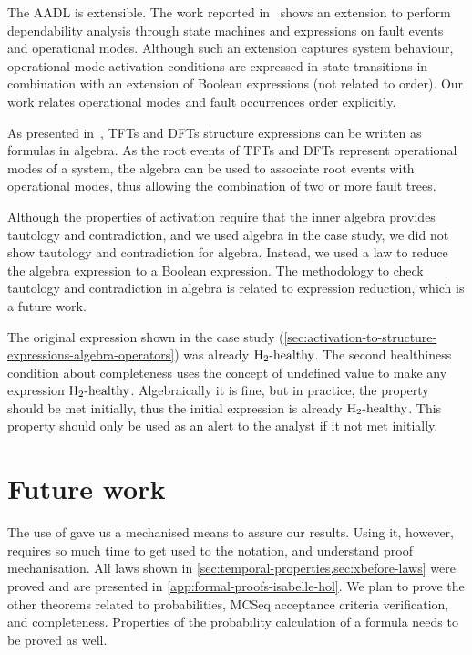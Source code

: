 
The \ac{AADL} is extensible. 
The work reported in~\cite{SAEAS55061A} shows an extension to perform dependability analysis through state machines and expressions on fault events and operational modes.
Although such an extension captures system behaviour, operational mode activation conditions are expressed in state transitions in combination with an extension of Boolean expressions (not related to order).
Our work relates operational modes and fault occurrences order explicitly.

As presented in~\cite{DM2016}, \acp{TFT} and \acp{DFT} structure expressions can be written as formulas in \ac{algebra}.
As the root events of \acp{TFT} and \acp{DFT} represent operational modes of a system, the \ac{algebra} can be used to associate root events with operational modes, thus allowing the combination of two or more fault trees.

Although the properties of \ac{activation} require that the inner algebra provides tautology and contradiction, and we used \ac{algebra} in the case study, we did not show tautology and contradiction for \ac{algebra}. 
Instead, we used a law to reduce the \ac{algebra} expression to a Boolean expression.
The methodology to check tautology and contradiction in \ac{algebra} is related to expression reduction, which is a future work.

The original expression shown in the case study (\cref{sec:activation-to-structure-expressions-algebra-operators}) was already $\healthy[2]$.
The second healthiness condition about completeness uses the concept of undefined value to make any expression $\healthy[2]$.
Algebraically it is fine, but in practice, the property should be met initially, thus the initial expression is already $\healthy[2]$.
This property should only be used as an alert to the analyst if it not met initially.

\section{Future work}

The use of \isabellehol gave us a mechanised means to assure our results.
Using it, however, requires so much time to get used to the notation, and understand proof mechanisation.
All laws shown in \cref{sec:temporal-properties,sec:xbefore-laws} were proved and are presented in \cref{app:formal-proofs-isabelle-hol}.
We plan to prove the other theorems related to probabilities, \ac{MCSeq} acceptance criteria verification, and completeness.
Properties of the probability calculation of a formula needs to be proved as well.

